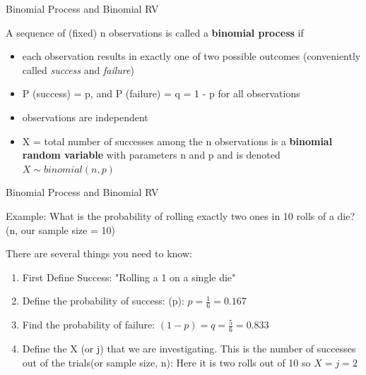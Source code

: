\documentclass[14pt]{beamer}\usepackage[]{graphicx}\usepackage[]{color}
\begin{document}
\begin{frame}[fragile]{Binomial Process and Binomial RV}


A sequence of (fixed) n observations is called a \textbf{binomial process} if

\begin{itemize}
\item<2-> each observation results in exactly one of two possible outcomes  (conveniently called \textit{success} and \textit{failure})
\item<2-> P (success) = p, and P (failure) = q = 1 - p for all observations  
\item<2-> observations are independent
\item<3-> X = total number of successes among the n observations is a  \textbf{binomial random variable} with parameters n and p and is denoted  $X \sim binomial(n, p)$
\end{itemize}

\end{frame}

\begin{frame}[fragile]{Binomial Process and Binomial RV}


Example: What is the probability of rolling exactly two ones in 10  rolls of a die? (n, our sample size = 10)

There are several things you need to know:  

\begin{enumerate}
\item First Define Success: "Rolling a 1 on a single die"

\item Define the probability of success: (p): $p = \frac{1}{6} = 0.167$ 

\item Find the probability of failure: $(1 - p) = q = \frac{5}{6} = 0.833$ 

\item Define the X (or j) that we are investigating.  This is the number of successes out of the trials(or sample size, n):  Here it is two rolls out of 10 so $X = j = 2$
\end{enumerate}

\end{frame}
\end{document}

